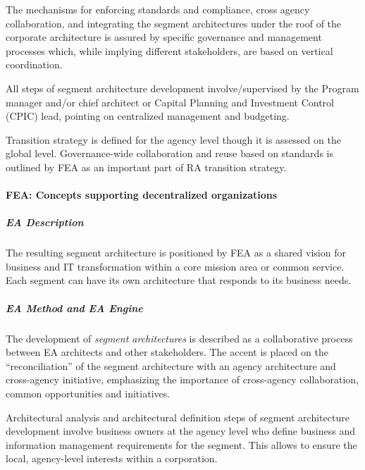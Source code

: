 The mechanisms for enforcing standards and compliance, cross agency collaboration, and integrating the segment architectures under the roof of the corporate architecture is  assured by specific governance and management processes which, while implying different stakeholders, are based on vertical coordination. 


All steps of segment architecture development involve/supervised by the Program manager and/or chief architect or Capital Planning and Investment Control (CPIC) lead, pointing on centralized management and budgeting.

Transition strategy is defined for the agency level though it is assessed on the global level. Governance-wide collaboration and reuse based on standards is outlined by FEA as an important part of RA transition strategy.

\paragraph*{FEA: Concepts supporting decentralized organizations}
\subparagraph*{EA Description}

The resulting segment architecture is positioned by FEA as a shared vision for business and IT transformation within a core mission area or common service. Each segment can have its own architecture that responds to its business needs.

\subparagraph*{EA Method and EA Engine}

The development of \textit{segment architectures} is described as a collaborative process between EA architects and other stakeholders. The accent is placed on the ``reconciliation'' of the segment architecture with an agency architecture and cross-agency initiative, emphasizing the importance of  cross-agency collaboration, common opportunities and initiatives.

Architectural analysis and architectural definition steps of segment architecture development involve business owners at the agency level who define business and information management requirements for the segment. This allows to ensure the local, agency-level interests within a corporation. 

